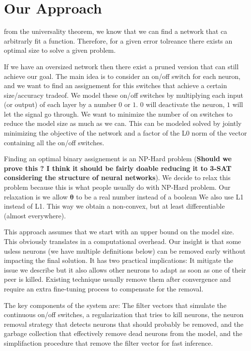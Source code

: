 \section{Our Approach}

from the universality theorem, we know that we can find a network that ca
arbitrarly fit a function. Therefore, for a given error tolreance there exists
an optimal size to solve a given problem.

If we have an oversized network then there exist a pruned version that can still
achieve our goal. The main idea is to consider an on/off switch for each neuron,
and we want to find an assignement for this switches that achieve a certain
size/accuracy tradeof. We model these on/off switches by multiplying each input
(or output) of each layer by a number $0$ or $1$. $0$ will deactivate the
neuron, $1$ will let the signal go through. We want to minimize the number of on
switches to reduce the model size as much as we can. This can be modeled solved
by jointly minimizing the objective of the network and a factor of the L0 norm
of the vector containing all the on/off switches.

Finding an optimal binary assignement is an NP-Hard problem (\textbf{Should we
prove this ? I think it should be fairly doable reducing it to 3-SAT
considering the structure of neural networks}). We decide to relax this
problem because this is what people usually do with NP-Hard problem. Our
relaxation is we allow $\bm{\theta}$ to be a real number instead of a boolean We
also use L1 instead of L1. This way we obtain a non-convex, but at least
differentiable (almost everywhere).

This approach assumes that we start with an upper bound on the model size. This
obviously translates in a computational overhead. Our insight is that some
usless neurons (we have multiple definitions below) can be removed early without
impacting the final solution. It has two practical implications: It mitigate the
issue we describe but it also allows other neurons to adapt as soon as one of
their peer is killed. Existing technique usually remove them after convergence
and require an extra fine-tuning process to compensate for the removal.

The key components of the system are: The filter vectors that simulate the
continuous on/off switches, a regularization that tries to kill neurons, the
neuron removal strategy that detects neurons that should probably be removed,
and the garbage collection that effectively remove dead neurons from the model,
and the simplifaction procedure that remove the filter vector for fast
inference.

